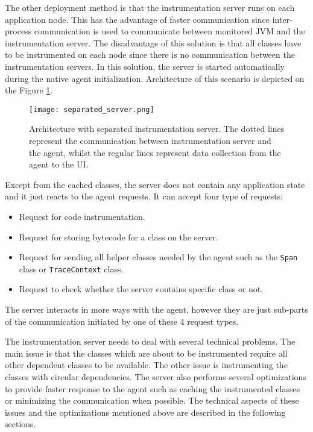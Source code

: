  The other deployment method is that the instrumentation server runs on each application node. This has the advantage of faster communication since  inter-process communication is used to communicate between monitored JVM and the instrumentation server. The disadvantage of this solution is that all classes have to be instrumented on each node since there is no communication between the instrumentation servers. In this solution, the server is started automatically during the native agent initialization. Architecture of this scenario is depicted on the Figure \ref{fig:separated_server}.
 
 \begin{figure}
 	\centering
 	\texttt{[image: separated\_server.png]}
 	\caption{Architecture with separated instrumentation server. The dotted lines represent the communication between instrumentation server and the agent, whilst the regular lines represent data collection from the agent to the UI.}
 	\label{fig:separated_server}
 \end{figure}

Except from the cached classes, the server does not contain any application state and it just reacts to the agent requests. It can accept four type of requests:
\begin{itemize}
	\item Request for code instrumentation.
	\item Request for storing bytecode for a class on the server.
	\item Request for sending all helper classes needed by the agent such as the \texttt{Span} class or \texttt{TraceContext} class.
	\item Request to check whether the server contains specific class or not.
\end{itemize}
The server interacts in more ways with the agent, however they are just sub-parts of the communication initiated by one of these 4 request types.	

The instrumentation server needs to deal with several technical problems. The main issue is that the classes which are about to be instrumented require all other dependent classes to be available. The other issue is instrumenting the classes with circular dependencies. The server also performs several optimizations to provide faster response to the agent such as caching the instrumented classes or minimizing the communication when possible. The technical aspects of these issues and the optimizations mentioned above are described in the following sections.
